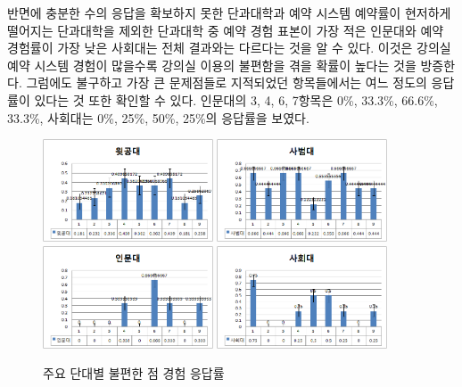 \documentclass[11pt,a4paper]{article}
\begin{document}
반면에 충분한 수의 응답을 확보하지 못한 단과대학과 예약 시스템 예약률이
현저하게 떨어지는 단과대학을 제외한 단과대학 중 예약 경험 표본이 가장 적은
인문대와 예약 경험률이 가장 낮은 사회대는 전체 결과와는 다르다는 것을 알 수
있다. 이것은 강의실 예약 시스템 경험이 많을수록 강의실 이용의 불편함을 겪을
확률이 높다는 것을 방증한다. 그럼에도 불구하고 가장 큰 문제점들로 지적되었던
항목들에서는 여느 정도의 응답률이 있다는 것 또한 확인할 수 있다. 인문대의 3, 4,
6, 7항목은 0\%, 33.3\%, 66.6\%, 33.3\%, 사회대는 0\%, 25\%, 50\%, 25\%의
응답률을 보였다.
\begin{figure}[h]
\includegraphics[width=0.45\textwidth]{4_1_3_1}
\includegraphics[width=0.45\textwidth]{4_1_3_2}
\includegraphics[width=0.45\textwidth]{4_1_3_3}
\includegraphics[width=0.45\textwidth]{4_1_3_4}
\centering
\caption{주요 단대별 불편한 점 경험 응답률}
\end{figure}
\end{document}
